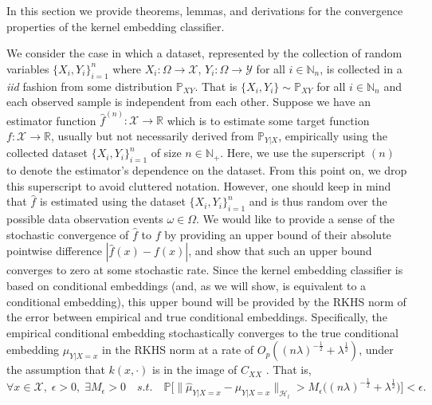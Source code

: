 \documentclass{article}
\begin{document}
	In this section we provide theorems, lemmas, and derivations for the convergence properties of the kernel embedding classifier.
	
	We consider the case in which a dataset, represented by the collection of random variables $\{X_{i}, Y_{i}\}_{i = 1}^{n}$ where $X_{i} : \Omega \to \mathcal{X}$,  $Y_{i} : \Omega \to \mathcal{Y}$ for all $i \in \mathbb{N}_{n}$, is collected in a \textit{iid} fashion from some distribution $\mathbb{P}_{X Y}$. That is $\{X_{i}, Y_{i}\} \sim \mathbb{P}_{X Y}$ for all $i \in \mathbb{N}_{n}$ and each observed sample is independent from each other. Suppose we have an estimator function $\hat{f}^{(n)} : \mathcal{X} \to \mathbb{R}$ which is to estimate some target function  $f : \mathcal{X} \to \mathbb{R}$, usually but not necessarily derived from $\mathbb{P}_{Y |X }$, empirically using the collected dataset $\{X_{i}, Y_{i}\}_{i = 1}^{n}$ of size $n \in \mathbb{N}_{+}$. Here, we use the superscript $(n)$ to denote the estimator's dependence on the dataset. From this point on, we drop this superscript to avoid cluttered notation. However, one should keep in mind that $\hat{f}$ is estimated using the dataset $\{X_{i}, Y_{i}\}_{i = 1}^{n}$ and is thus random over the possible data observation events $\omega \in \Omega$. We would like to provide a sense of the stochastic convergence of $\hat{f}$ to $f$ by providing an upper bound of their absolute pointwise difference $| \hat{f}(x) - f(x) |$, and show that such an upper bound converges to zero at some stochastic rate. Since the kernel embedding classifier is based on conditional embeddings (and, as we will show, is equivalent to a conditional embedding), this upper bound will be provided by the RKHS norm of the error between empirical and true conditional embeddings. Specifically, the empirical conditional embedding stochastically converges to the true conditional embedding $\mu_{Y | X = x}$ in the RKHS norm at a rate of $O_{p}((n \lambda)^{-\frac{1}{2}} + \lambda^{\frac{1}{2}})$, under the assumption that $k(x, \cdot)$ is in the image of $C_{XX}$ \cite[Theorem 6]{song2009hilbert}. That is,
	\begin{equation}
		\forall x \in \mathcal{X}, \; \epsilon > 0, \; \exists M_{\epsilon} > 0 \quad s.t. \quad \mathbb{P}\Big[\big\| \hat{\mu}_{Y | X = x} - \mu_{Y | X = x} \big\|_{\mathcal{H}_{l}} > M_{\epsilon} \Big((n \lambda)^{-\frac{1}{2}} + \lambda^{\frac{1}{2}}\Big)\Big] < \epsilon.
	\label{eq:empirical_conditional_embedding_stochastic_convergence}
	\end{equation}
\end{document}
